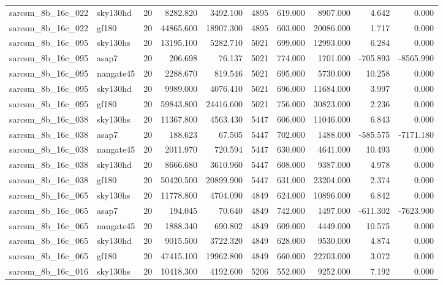 \documentclass{article}
\begin{document}
\begin{longtable}{llrrrrrrrr}
sarcsm\_8b\_16c\_022 & sky130hd & 20 & 8282.820 & 3492.100 & 4895 & 619.000 & 8907.000 & 4.642 & 0.000 \\
sarcsm\_8b\_16c\_022 & gf180 & 20 & 44865.600 & 18907.300 & 4895 & 603.000 & 20086.000 & 1.717 & 0.000 \\
sarcsm\_8b\_16c\_095 & sky130hs & 20 & 13195.100 & 5282.710 & 5021 & 699.000 & 12993.000 & 6.284 & 0.000 \\
sarcsm\_8b\_16c\_095 & asap7 & 20 & 206.698 & 76.137 & 5021 & 774.000 & 1701.000 & -705.893 & -8565.990 \\
sarcsm\_8b\_16c\_095 & nangate45 & 20 & 2288.670 & 819.546 & 5021 & 695.000 & 5730.000 & 10.258 & 0.000 \\
sarcsm\_8b\_16c\_095 & sky130hd & 20 & 9989.000 & 4076.410 & 5021 & 696.000 & 11684.000 & 3.997 & 0.000 \\
sarcsm\_8b\_16c\_095 & gf180 & 20 & 59843.800 & 24416.600 & 5021 & 756.000 & 30823.000 & 2.236 & 0.000 \\
sarcsm\_8b\_16c\_038 & sky130hs & 20 & 11367.800 & 4563.430 & 5447 & 606.000 & 11046.000 & 6.843 & 0.000 \\
sarcsm\_8b\_16c\_038 & asap7 & 20 & 188.623 & 67.505 & 5447 & 702.000 & 1488.000 & -585.575 & -7171.180 \\
sarcsm\_8b\_16c\_038 & nangate45 & 20 & 2011.970 & 720.594 & 5447 & 630.000 & 4641.000 & 10.493 & 0.000 \\
sarcsm\_8b\_16c\_038 & sky130hd & 20 & 8666.680 & 3610.960 & 5447 & 608.000 & 9387.000 & 4.978 & 0.000 \\
sarcsm\_8b\_16c\_038 & gf180 & 20 & 50420.500 & 20899.900 & 5447 & 631.000 & 23204.000 & 2.374 & 0.000 \\
sarcsm\_8b\_16c\_065 & sky130hs & 20 & 11778.800 & 4704.090 & 4849 & 624.000 & 10896.000 & 6.842 & 0.000 \\
sarcsm\_8b\_16c\_065 & asap7 & 20 & 194.045 & 70.640 & 4849 & 742.000 & 1497.000 & -611.302 & -7623.900 \\
sarcsm\_8b\_16c\_065 & nangate45 & 20 & 1888.340 & 690.802 & 4849 & 609.000 & 4449.000 & 10.575 & 0.000 \\
sarcsm\_8b\_16c\_065 & sky130hd & 20 & 9015.500 & 3722.320 & 4849 & 628.000 & 9530.000 & 4.874 & 0.000 \\
sarcsm\_8b\_16c\_065 & gf180 & 20 & 47415.100 & 19962.800 & 4849 & 660.000 & 22703.000 & 3.072 & 0.000 \\
sarcsm\_8b\_16c\_016 & sky130hs & 20 & 10418.300 & 4192.600 & 5206 & 552.000 & 9252.000 & 7.192 & 0.000 \\

\end{longtable}
\end{document}
